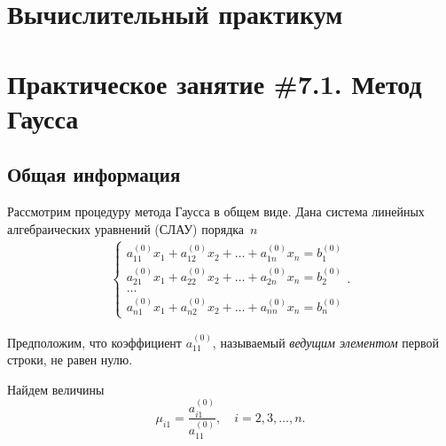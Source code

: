 \documentclass[12pt]{article}
\begin{document}
    \begin{flushright}
    \end{flushright}
    \begin{flushright}
	\end{flushright}
    \section*{Вычислительный практикум}
    \section*{Практическое занятие \#7.1. Метод Гаусса}

    \subsection*{Общая информация}

    Рассмотрим процедуру метода Гаусса в общем виде. Дана система линейных алгебраических уравнений (СЛАУ) порядка~$n$
    \begin{equation}
        \begin{gathered}
        	\begin{cases}
        		a_{11}^{\left(0\right)}x_1+a_{12}^{\left(0\right)}x_2+\ldots+a_{1n}^{\left(0\right)}x_n=b_{1}^{\left(0\right)}\\
        		a_{21}^{\left(0\right)}x_1+a_{22}^{\left(0\right)}x_2+\ldots+a_{2n}^{\left(0\right)}x_n=b_{2}^{\left(0\right)}\\
        		\ldots\\
        		a_{n1}^{\left(0\right)}x_1+a_{n2}^{\left(0\right)}x_2+\ldots+a_{nn}^{\left(0\right)}x_n=b_{n}^{\left(0\right)}
        	\end{cases}.
        \end{gathered}\label{7.1:f1}
    \end{equation}

    Предположим, что коэффициент $a_{11}^{\left(0\right)}$, называемый \emph{ведущим элементом} первой строки, не равен нулю.

    Найдем величины
    \begin{equation}
        \mu_{i1} = \frac{a^{\left(0\right)}_{i1}}{a^{\left(0\right)}_{11}},\quad i=2,3,\ldots, n.\label{7.1:f2}
    \end{equation}
    
\end{document}
